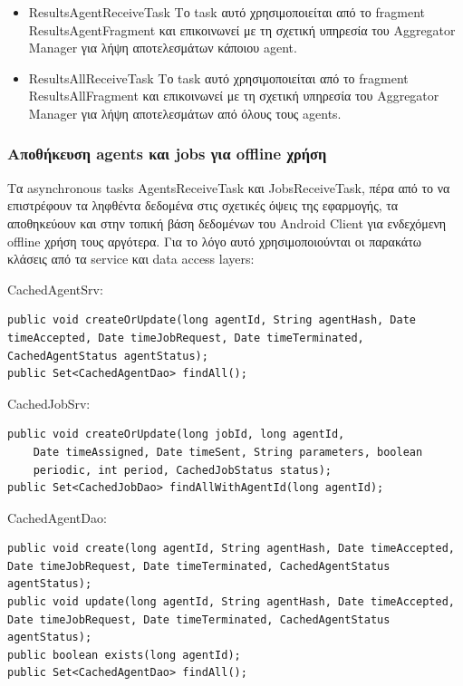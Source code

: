 \documentclass[a4paper,11pt]{article}
\begin{document}
\begin{sloppypar}
\begin{itemize}
\begin{itemize}
\item ResultsAgentReceiveTask
\newline
Το task αυτό χρησιμοποιείται από το fragment ResultsAgentFragment και επικοινωνεί με τη σχετική υπηρεσία του Aggregator Manager για λήψη αποτελεσμάτων κάποιου agent.

\item ResultsAllReceiveTask
\newline
Το task αυτό χρησιμοποιείται από το fragment ResultsAllFragment και επικοινωνεί με τη σχετική υπηρεσία του Aggregator Manager για λήψη αποτελεσμάτων από όλους τους agents.

\end{itemize}

\newpage

\subsubsection{Αποθήκευση agents και jobs για offline χρήση}

Τα asynchronous tasks AgentsReceiveTask και JobsReceiveTask, πέρα από το να επιστρέφουν τα ληφθέντα δεδομένα στις σχετικές όψεις της εφαρμογής, τα αποθηκεύουν και στην τοπική βάση δεδομένων του Android Client για ενδεχόμενη offline χρήση τους αργότερα. Για το λόγο αυτό χρησιμοποιούνται οι παρακάτω κλάσεις από τα service και data access layers:

CachedAgentSrv:
\begin{lstlisting}
public void createOrUpdate(long agentId, String agentHash, Date timeAccepted, Date timeJobRequest, Date timeTerminated, CachedAgentStatus agentStatus);
public Set<CachedAgentDao> findAll();
\end{lstlisting}

CachedJobSrv:
\begin{lstlisting}
public void createOrUpdate(long jobId, long agentId,
    Date timeAssigned, Date timeSent, String parameters, boolean
    periodic, int period, CachedJobStatus status);
public Set<CachedJobDao> findAllWithAgentId(long agentId);
\end{lstlisting}

CachedAgentDao:

\begin{lstlisting}
public void create(long agentId, String agentHash, Date timeAccepted, Date timeJobRequest, Date timeTerminated, CachedAgentStatus agentStatus);
public void update(long agentId, String agentHash, Date timeAccepted, Date timeJobRequest, Date timeTerminated, CachedAgentStatus agentStatus);
public boolean exists(long agentId);
public Set<CachedAgentDao> findAll();
\end{lstlisting}


\end{itemize}
\end{sloppypar}
\end{document}
